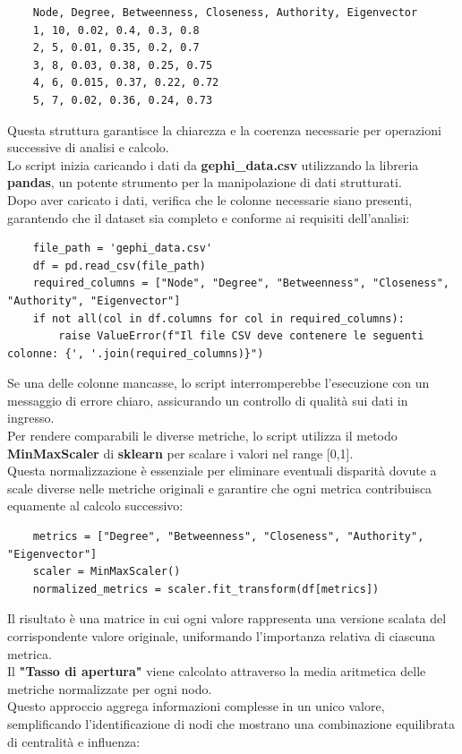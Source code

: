 \documentclass[12pt]{article}
\begin{document}
	\begin{lstlisting}
	Node, Degree, Betweenness, Closeness, Authority, Eigenvector
	1, 10, 0.02, 0.4, 0.3, 0.8
	2, 5, 0.01, 0.35, 0.2, 0.7
	3, 8, 0.03, 0.38, 0.25, 0.75
	4, 6, 0.015, 0.37, 0.22, 0.72
	5, 7, 0.02, 0.36, 0.24, 0.73
	\end{lstlisting}
	Questa struttura garantisce la chiarezza e la coerenza necessarie per operazioni successive di analisi e calcolo.\\
	Lo script inizia caricando i dati da \textbf{gephi\_data.csv} utilizzando la libreria \textbf{pandas}, un potente strumento per la manipolazione di dati strutturati.\\ 
	Dopo aver caricato i dati, verifica che le colonne necessarie siano presenti, garantendo che il dataset sia completo e conforme ai requisiti dell'analisi:
	\begin{lstlisting}
	file_path = 'gephi_data.csv'
	df = pd.read_csv(file_path)
	required_columns = ["Node", "Degree", "Betweenness", "Closeness", "Authority", "Eigenvector"]
	if not all(col in df.columns for col in required_columns):
		raise ValueError(f"Il file CSV deve contenere le seguenti colonne: {', '.join(required_columns)}")
	\end{lstlisting}
	Se una delle colonne mancasse, lo script interromperebbe l'esecuzione con un messaggio di errore chiaro, assicurando un controllo di qualità sui dati in ingresso.\\
	Per rendere comparabili le diverse metriche, lo script utilizza il metodo \textbf{MinMaxScaler} di \textbf{sklearn} per scalare i valori nel range [0,1].\\
	Questa normalizzazione è essenziale per eliminare eventuali disparità dovute a scale diverse nelle metriche originali e garantire che ogni metrica contribuisca equamente al calcolo successivo:
	\begin{lstlisting}
	metrics = ["Degree", "Betweenness", "Closeness", "Authority", "Eigenvector"]
	scaler = MinMaxScaler()
	normalized_metrics = scaler.fit_transform(df[metrics])
	\end{lstlisting}
	Il risultato è una matrice in cui ogni valore rappresenta una versione scalata del corrispondente valore originale, uniformando l'importanza relativa di ciascuna metrica.\\
	Il \textbf{"Tasso di apertura"} viene calcolato attraverso la media aritmetica delle metriche normalizzate per ogni nodo.\\
	Questo approccio aggrega informazioni complesse in un unico valore, semplificando l'identificazione di nodi che mostrano una combinazione equilibrata di centralità e influenza:
\end{document}
